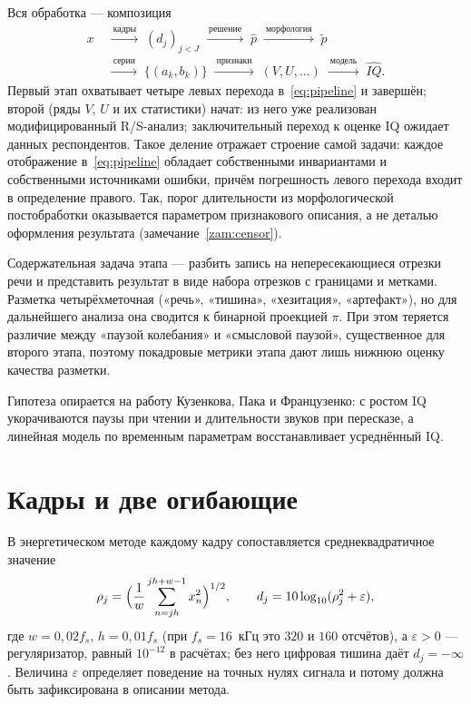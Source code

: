 \documentclass[11pt,a4paper]{article}
\theoremstyle{definition}
\theoremstyle{plain}
\begin{document}
Вся обработка --- композиция
\begin{equation}\label{eq:pipeline}
\begin{aligned}
x\;&\xrightarrow{\ \text{кадры}\ }\;(d_j)_{j<J}
\;\xrightarrow{\ \text{решение}\ }\;\hat p
\;\xrightarrow{\ \text{морфология}\ }\;\tilde p\\[2pt]
&\xrightarrow{\ \text{серии}\ }\;\{(a_k,b_k)\}
\;\xrightarrow{\ \text{признаки}\ }\;(V,U,\dots)
\;\xrightarrow{\ \text{модель}\ }\;\widehat{IQ}.
\end{aligned}
\end{equation}
Первый этап охватывает четыре левых перехода в~\eqref{eq:pipeline} и завершён;
второй (ряды $V$, $U$ и их статистики) начат: из него уже реализован
модифицированный R/S-анализ; заключительный переход к оценке IQ ожидает данных
респондентов. Такое деление отражает строение самой задачи: каждое отображение
в~\eqref{eq:pipeline} обладает собственными инвариантами и собственными
источниками ошибки, причём погрешность левого перехода входит в определение
правого. Так, порог длительности из морфологической постобработки оказывается
параметром признакового описания, а не деталью оформления результата
(замечание~\ref{zam:censor}).

Содержательная задача этапа --- разбить запись на непересекающиеся отрезки речи
и представить результат в виде набора отрезков с границами и метками. Разметка
четырёхметочная («речь», «тишина», «хезитация», «артефакт»), но для дальнейшего
анализа она сводится к бинарной проекцией $\pi$. При этом теряется различие
между «паузой колебания» и «смысловой паузой», существенное для второго этапа,
поэтому покадровые метрики этапа дают лишь нижнюю оценку качества разметки.

Гипотеза опирается на работу Кузенкова, Пака и Французенко: с ростом IQ
укорачиваются паузы при чтении и длительности звуков при пересказе, а линейная
модель по временным параметрам восстанавливает усреднённый IQ.

\section{Кадры и две огибающие}

В энергетическом методе каждому кадру сопоставляется среднеквадратичное значение
\begin{equation}\label{eq:rms}
\rho_j=\Bigl(\frac1w\sum_{n=jh}^{jh+w-1}x_n^2\Bigr)^{1/2},
\qquad d_j=10\log_{10}(\rho_j^2+\varepsilon),
\end{equation}
где $w=0{,}02f_s$, $h=0{,}01f_s$ (при $f_s=16$~кГц это $320$ и $160$ отсчётов),
а $\varepsilon>0$ --- регуляризатор, равный $10^{-12}$ в расчётах; без него
цифровая тишина даёт $d_j=-\infty$. Величина $\varepsilon$ определяет поведение
на точных нулях сигнала и потому должна быть зафиксирована в описании метода.
\end{document}
